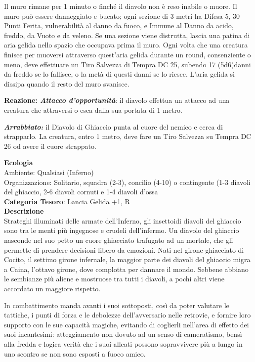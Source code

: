 \begin{multicols}{2}
{Il muro rimane per 1 minuto o finché il diavolo non è reso inabile o muore. Il muro può essere danneggiato e bucato; ogni sezione di 3 metri ha Difesa 5, 30 Punti Ferita, vulnerabilità al danno da fuoco, e Immune al Danno da acido, freddo, da Vuoto e da veleno. Se una sezione viene distrutta, lascia una patina di aria gelida nello spazio che occupava prima il muro. Ogni volta che una creatura finisce per muoversi attraverso quest'aria gelida durante un round, consenziente o meno, deve effettuare un Tiro Salvezza di Tempra DC 25, subendo 17 (5d6)danni da freddo se lo fallisce, o la metà di questi danni se lo riesce. L'aria gelida si dissipa quando il resto del muro svanisce.

\textbf{Reazione: \emph{Attacco d'opportunità}}: il diavolo effettua un attacco ad una creatura che attraversi o esca dalla sua portata di 1 metro.

\emph{\textbf{Arrabbiato:}} il Diavolo di Ghiaccio punta al cuore del nemico e cerca di strapparlo. La creatura, entro 1 metro, deve fare un Tiro Salvezza su Tempra DC 26 od avere il cuore strappato.

\textbf{Ecologia}\\
Ambiente: Qualsiasi (Inferno)\\
Organizzazione: Solitario, squadra (2-3), concilio (4-10) o contingente (1-3 diavoli del ghiaccio, 2-6 diavoli cornuti e 1-4 diavoli d'ossa\\
\textbf{Categoria Tesoro}: Lancia Gelida +1, R\\
\textbf{Descrizione}\\
Strateghi illuminati delle armate dell'Inferno, gli insettoidi diavoli del ghiaccio sono tra le menti più ingegnose e crudeli dell'infermo. Un diavolo del ghiaccio nasconde nel suo petto un cuore ghiacciato trafugato ad un mortale, che gli permette di prendere decisioni libero da emozioni. Nati nel girone ghiacciato di Cocito, il settimo girone infernale, la maggior parte dei diavoli del ghiaccio migra a Caina, l'ottavo girone, dove complotta per dannare il mondo. Sebbene abbiano le sembianze più aliene e mostruose tra tutti i diavoli, a pochi altri viene accordato un maggiore rispetto.

In combattimento manda avanti i suoi sottoposti, così da poter valutare le tattiche, i punti di forza e le debolezze dell'avversario nelle retrovie, e fornire loro supporto con le sue capacità magiche, evitando di coglierli nell'area di effetto dei suoi incantesimi: atteggiamento non dovuto ad un senso di cameratismo, bensì alla fredda e logica verità che i suoi alleati possono sopravvivere più a lungo in uno scontro se non sono esposti a fuoco amico.

}
\end{multicols}

